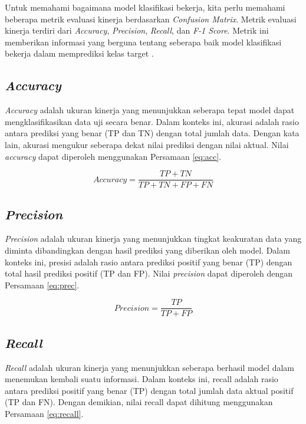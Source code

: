Untuk memahami bagaimana model klasifikasi bekerja, kita perlu memahami beberapa metrik evaluasi kinerja berdasarkan \emph{Confusion Matrix}. Metrik evaluasi kinerja terdiri dari \emph{Accuracy}, \emph{Precision}, \emph{Recall}, dan \emph{F-1 Score}. Metrik ini memberikan informasi yang berguna tentang seberapa baik model klasifikasi bekerja dalam memprediksi kelas target \parencite{provost2013data}.

\subsection{\emph{Accuracy}}
\label{subsec:acc_klasifikasi}

\emph{Accuracy} adalah ukuran kinerja yang menunjukkan seberapa tepat model dapat mengklasifikasikan data uji secara benar. Dalam konteks ini, akurasi adalah rasio antara prediksi yang benar (TP dan TN) dengan total jumlah data. Dengan kata lain, akurasi mengukur seberapa dekat nilai prediksi dengan nilai aktual. Nilai \emph{accuracy} dapat diperoleh menggunakan Persamaan \ref{eq:acc}. 

\begin{equation}
  \label{eq:acc}
  Accuracy=\frac{TP+TN}{TP+TN+FP+FN}
\end{equation}

\subsection{\emph{Precision}}
\label{subsec:prec_klasifikasi}

\emph{Precision} adalah ukuran kinerja yang menunjukkan tingkat keakuratan data yang diminta dibandingkan dengan hasil prediksi yang diberikan oleh model. Dalam konteks ini, presisi adalah rasio antara prediksi positif yang benar (TP) dengan total hasil prediksi positif (TP dan FP). Nilai \emph{precision} dapat diperoleh dengan Persamaan \ref{eq:prec}.

\begin{equation}
  \label{eq:prec}
  Precision=\frac{TP}{TP+FP}
\end{equation}

\subsection{\emph{Recall}}
\label{subsec:recall_klasifikasi}

\emph{Recall} adalah ukuran kinerja yang menunjukkan seberapa berhasil model dalam menemukan kembali suatu informasi. Dalam konteks ini, recall adalah rasio antara prediksi positif yang benar (TP) dengan total jumlah data aktual positif (TP dan FN). Dengan demikian, nilai recall dapat dihitung menggunakan Persamaan \ref{eq:recall}.

